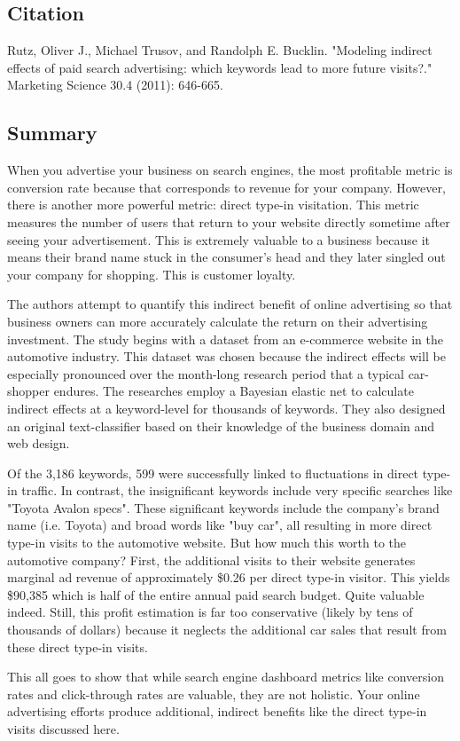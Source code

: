 \documentclass[../summaries.tex]{subfiles}
\begin{document}
\subsection{Citation}
Rutz, Oliver J., Michael Trusov, and Randolph E. Bucklin. "Modeling indirect effects of paid search advertising: which keywords lead to more future visits?." Marketing Science 30.4 (2011): 646-665.

\subsection{Summary}
When you advertise your business on search engines, the most profitable metric is conversion rate because that corresponds to revenue for your company. However, there is another more powerful metric:  direct type-in visitation. This metric measures the number of users that return to your website directly sometime after seeing your advertisement. This is extremely valuable to a business because it means their brand name stuck in the consumer's head and they later singled out your company for shopping. This is customer loyalty.

The authors attempt to quantify this indirect benefit of online advertising so that business owners can more accurately calculate the return on their advertising investment. The study begins with a dataset from an e-commerce website in the automotive industry. This dataset was chosen because the indirect effects will be especially pronounced over the month-long research period that a typical car-shopper endures. The researches employ a Bayesian elastic net to calculate indirect effects at a keyword-level for thousands of keywords. They also designed an original text-classifier based on their knowledge of the business domain and web design.

Of the 3,186 keywords, 599 were successfully linked to fluctuations in direct type-in traffic. In contrast, the insignificant keywords include very specific searches like "Toyota Avalon specs". These significant keywords include the company's brand name (i.e. Toyota) and broad words like "buy car", all resulting in more direct type-in visits to the automotive website. But how much this worth to the automotive company? First, the additional visits to their website generates marginal ad revenue of approximately \$0.26 per direct type-in visitor. This yields \$90,385 which is half of the entire annual paid search budget. Quite valuable indeed. Still, this profit estimation is far too conservative (likely by tens of thousands of dollars) because it neglects the additional car sales that result from these direct type-in visits.

This all goes to show that while search engine dashboard metrics like conversion rates and click-through rates are valuable, they are not holistic. Your online advertising efforts produce additional, indirect benefits like the direct type-in visits discussed here.
\end{document}

